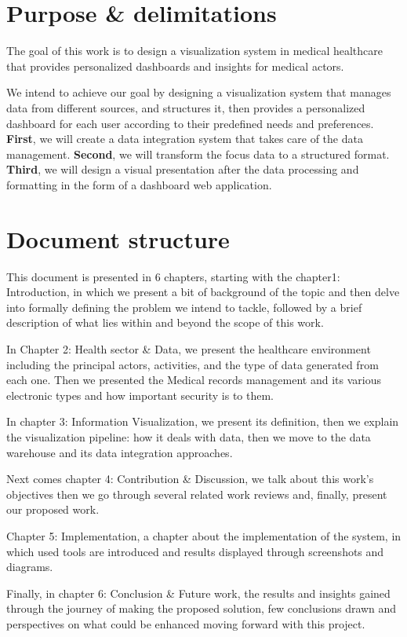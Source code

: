 \section{Purpose \& delimitations}

The goal of this work is to design a visualization system in medical healthcare that provides personalized dashboards and insights for medical actors.
 
We intend to achieve our goal by designing a visualization system that manages data from different sources, and structures it, then provides a personalized dashboard for each user according to their predefined needs and preferences.
 \newline
 \textbf{First}, we will create a data integration system that takes care of the data management.\newline 
 \textbf{Second}, we will transform the focus data to a structured format.\newline
 \textbf{Third}, we will design a visual presentation after the data processing and formatting in the form of a dashboard web application.

 
\section{Document structure}
This document is presented in 6 chapters, starting with the chapter1: Introduction, in which we present a bit of background of the topic and then delve into formally defining the problem we intend to tackle, followed by a brief description of what lies within and beyond the scope of this work.
 
In Chapter 2: Health sector \& Data, we present the healthcare environment including the principal actors, activities, and the type of data generated from each one. Then we presented the Medical records management and its various electronic types and how important security is to them.
 
In chapter 3: Information Visualization, we present its definition, then we explain the visualization pipeline: how it deals with data, then we move to the data warehouse and its data integration approaches.
 
 Next comes chapter 4: Contribution \& Discussion, we talk about this work's objectives then we go through several related work reviews and, finally, present our proposed work. 
 
 Chapter 5: Implementation, a chapter about the implementation of the system, in which used tools are introduced and results displayed through screenshots and diagrams.
 
Finally, in chapter 6: Conclusion \& Future work, the results and insights gained through the journey of making the proposed solution, few conclusions drawn and perspectives on what could be enhanced moving forward with this project.

